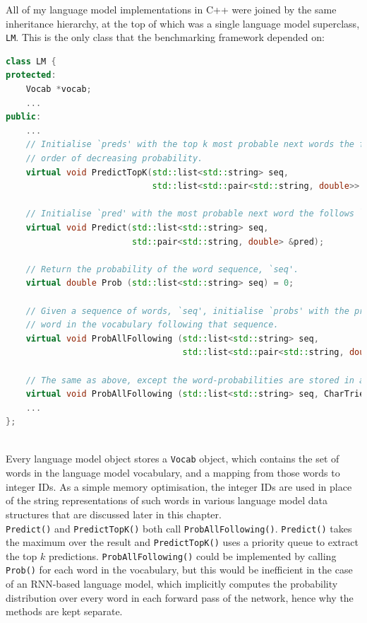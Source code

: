 \documentclass[a4paper, 12pt]{report}
\newcommand{\ttt}[1]{\texttt{#1}}
\begin{document}
All of my language model implementations in C++ were joined by the same inheritance hierarchy, at the top of which was a single language model superclass, \ttt{LM}. This is the only class that the benchmarking framework depended on: \\

\begin{lstlisting}[language=C++]
class LM {
protected:
    Vocab *vocab;
    ...
public:
    ...
    // Initialise `preds' with the top k most probable next words the follow `seq', in
    // order of decreasing probability.
    virtual void PredictTopK(std::list<std::string> seq,
                             std::list<std::pair<std::string, double>> &preds, int k);

    // Initialise `pred' with the most probable next word the follows `seq'.
    virtual void Predict(std::list<std::string> seq,
                         std::pair<std::string, double> &pred);

    // Return the probability of the word sequence, `seq'.
    virtual double Prob (std::list<std::string> seq) = 0;
    
    // Given a sequence of words, `seq', initialise `probs' with the probability of each
    // word in the vocabulary following that sequence.
    virtual void ProbAllFollowing (std::list<std::string> seq,
                                   std::list<std::pair<std::string, double>> &probs) = 0;
    
    // The same as above, except the word-probabilities are stored in a character trie.
    virtual void ProbAllFollowing (std::list<std::string> seq, CharTrie *probs) = 0;
    ...
};
\end{lstlisting}
~\\

Every language model object stores a \ttt{Vocab} object, which contains the set of words in the language model vocabulary, and a mapping from those words to integer IDs. As a simple memory optimisation, the integer IDs are used in place of the string representations of such words in various language model data structures that are discussed later in this chapter. \\

\ttt{Predict()} and \ttt{PredictTopK()} both call \ttt{ProbAllFollowing()}. \ttt{Predict()} takes the maximum over the result and \ttt{PredictTopK()} uses a priority queue to extract the top $k$ predictions. \ttt{ProbAllFollowing()} could be implemented by calling \ttt{Prob()} for each word in the vocabulary, but this would be inefficient in the case of an RNN-based language model, which implicitly computes the probability distribution over every word in each forward pass of the network, hence why the methods are kept separate. \\
\end{document}
